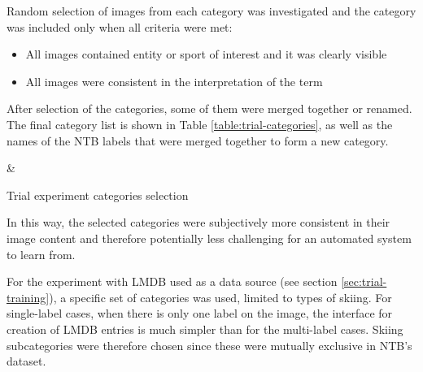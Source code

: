     Random selection of images from each category was investigated and the category was included only when all criteria were met:
    \begin{itemize}
        \item All images contained entity or sport of interest and it was clearly visible
        \item All images were consistent in the interpretation of the term
    \end{itemize}
    
    After selection of the categories, some of them were merged together or renamed. The final category list is shown in Table \ref{table:trial-categories}, as well as the names of the NTB labels that were merged together to form a new category.
    
    \begin{table}[H]
    \small
    \centering
    {}
    {\category & \ntbcategories}
    
    \caption{Trial experiment categories selection}
    \label{table:trial-categories}
    \end{table}
    
    In this way, the selected categories were subjectively more consistent in their image content and therefore potentially less challenging for an automated system to learn from.
    
    For the experiment with LMDB \cite{lmdb} used as a data source (see section \ref{sec:trial-training}), a specific set of categories was used, limited to types of skiing. For single-label cases, when there is only one label on the image, the interface for creation of LMDB entries is much simpler than for the multi-label cases. Skiing subcategories were therefore chosen since these were mutually exclusive in NTB's dataset.
    
